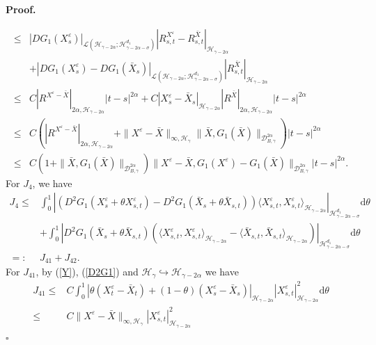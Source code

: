 \documentclass[10pt,a4paper]{article}
\numberwithin{equation}{section}
\newenvironment{proof}[1][\normalfont\bfseries Proof]{%
	\noindent #1.\hspace{0.5em}%
	\ignorespaces%
}{%
	\hfill $\square$%
	\par%
}
\begin{document}
\begin{proof}
\begin{align}
		\leq & |DG_1(X_s^\varepsilon)|_{\mathcal L(\mathcal H_{\gamma-2\alpha}; \mathcal H_{\gamma-2\alpha-\sigma}^{d_1 })} |R_{s,t}^{X^\varepsilon}-R_{s,t}^{\bar{X}}|_{\mathcal H_{\gamma-2\alpha}}  \nonumber\\
		&+|DG_1(X_s^\varepsilon)-DG_1(\bar{X}_s)|_{\mathcal L (\mathcal H_{\gamma-2\alpha}; \mathcal H_{\gamma-2\alpha-\sigma}^{d_1 })} |R_{s,t}^{\bar{X}}|_{\mathcal H_{\gamma-2\alpha}} \nonumber\\
		\leq & C |R^{X^\varepsilon-\bar{X}}|_{2\alpha, \mathcal H_{\gamma-2\alpha}} |t-s|^{2\alpha} +C |X_s^\varepsilon-\bar{X}_s|_{\mathcal H_{\gamma-2\alpha}} |R^{\bar{X}} |_{2\alpha, \mathcal H_{\gamma-2\alpha}} |t-s|^{2\alpha} \nonumber\\
		\leq & C \left(|R^{X^\varepsilon-\bar{X}}|_{2\alpha, \mathcal H_{\gamma-2\alpha}}+\|X^\varepsilon-\bar{X}\|_{\infty, \mathcal H_\gamma} \|\bar{X}, G_1(\bar{X})\|_{\mathcal{D}_{ B,\gamma}^{2\alpha}}  \right) |t-s|^{2\alpha}  \nonumber\\
		\leq & C \left( 1+\|\bar{X}, G_1(\bar{X})\|_{\mathcal{D}_{ B,\gamma}^{2\alpha}} \right) \|X^\varepsilon-\bar{X},G_1(X^\varepsilon)-G_1(\bar{X})\|_{\mathcal{D}_{ B,\gamma}^{2\alpha}} |t-s|^{2\alpha}.
	\end{align}
	For $J_4$, we have
	\begin{align*}
		J_4 \leq & \int_0^1 |(D^2 G_1(X_s^\varepsilon+\theta X_{s,t}^\varepsilon)-D^2 G_1(\bar{X}_s+\theta \bar{X}_{s,t}))  \langle X_{s,t}^\varepsilon, X_{s,t}^\varepsilon \rangle_{\mathcal H_{\gamma-2\alpha} }   |_{\mathcal H_{\gamma-2\alpha-\sigma}^{d_1 }} \mathrm{d} \theta \nonumber\\
		&+\int_0^1 |D^2 G_1(\bar{X}_s+\theta \bar{X}_{s,t}) ( \langle X_{s,t}^\varepsilon, X_{s,t}^\varepsilon \rangle_{\mathcal H_{\gamma-2\alpha} }-\langle \bar{X}_{s,t}, \bar{X}_{s,t} \rangle_{\mathcal H_{\gamma-2\alpha} } ) |_{\mathcal H_{\gamma-2\alpha-\sigma}^{d_1 }} \mathrm{d} \theta \nonumber\\
		=:& J_{41}+J_{42}.
	\end{align*}
	For $J_{41}$, by (\ref{Y}), (\ref{D2G1}) and $\mathcal H_\gamma \hookrightarrow \mathcal H_{\gamma-2\alpha}$ we have
	\begin{align}\label{J41}
		J_{41} 	\leq & C  \int_0^1 |\theta (X_t^\varepsilon-\bar{X}_t)+(1-\theta) (X_s^\varepsilon-\bar{X}_s)|_{\mathcal H_{\gamma-2\alpha}} |X_{s,t}^\varepsilon|_{\mathcal H_{\gamma-2\alpha}}^2 \mathrm{d} \theta \nonumber\\
		\leq  & C \|X^\varepsilon-\bar{X}\|_{\infty, \mathcal H_\gamma} |X_{s,t}^\varepsilon|_{\mathcal H_{\gamma-2\alpha}}^2

\end{align}
\end{proof}
\end{document}
